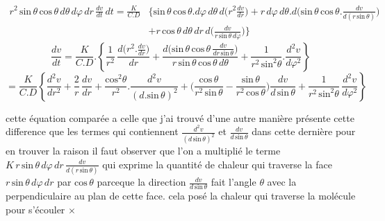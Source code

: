 \documentclass[11pt,a4paper]{article}
\begin{document}
\begin{align*}
r^2\,\text{sin}\,\theta\,\text{cos}\,\theta\,d\theta\,d\varphi\,dr\,\frac{dv}{dt}\,dt = \frac{K}{C.D} & \Big\{\text{sin}\,\theta\,\text{cos}\,\theta.d\varphi\,d\theta\,d\Big(r^2\frac{dv}{dr}\Big) + r\,d\varphi\,d\theta.d\Big(\text{sin}\,\theta\,\text{cos}\,\theta.\frac{dv}{d(r\,\text{sin}\,\theta)}\Big) \\
& + r\,\text{cos}\,\theta\,d\theta\,dr\,d\Big(\frac{dv}{r\,\text{sin}\,\theta\,d\varphi}\Big)\Big\}
\end{align*}
\[ \frac{dv}{dt} = \frac{K}{C.D}.\left\{\frac{1}{r^2}\,\frac{d\big(r^2.\frac{dv}{dr}\big)}{dr} + \frac{d\big(\text{sin}\,\theta\,\text{cos}\,\theta\,\frac{dv}{dr\,\text{sin}\,\theta}\big)}{r\,\text{sin}\,\theta\,\text{cos}\,\theta\,d\theta} + \frac{1}{r^2\,\text{sin}^2\theta}.\frac{d^2v}{d\varphi^2}\right\} \]
\[ = \frac{K}{C.D}\left\{\frac{d^2v}{dr^2} + \frac{2}{r}\,\frac{dv}{dr} + \frac{\text{cos}^2\theta}{r^2}.\frac{d^2v}{(d.\text{sin}\,\theta)^2} + \Big(\frac{\text{cos}\,\theta}{r^2\,\text{sin}\,\theta} - \frac{\text{sin}\,\theta}{r^2\,\text{cos}\,\theta}\Big)\frac{dv}{d\,\text{sin}\,\theta} + \frac{1}{r^2\,\text{sin}^2\theta}\,\frac{d^2v}{d\varphi^2}\right\} \]

cette équation comparée a celle que j'ai trouvé d'une
autre manière présente cette difference que les termes
qui contiennent $\frac{d^2v}{(d\,\text{sin}\,\theta)^2}$ et $\frac{dv}{d\,\text{sin}\,\theta}$   dans cette dernière
 pour en trouver la raison il faut observer que l'on a multiplié
le terme $K\,r\,\text{sin}\,\theta\,d\varphi\,dr\,\frac{dv}{d(r\,\text{sin}\,\theta)}$ qui exprime la quantité de chaleur
qui traverse la face $r\,\text{sin}\,\theta\,d\varphi\,dr$ par $\text{cos}\,\theta$ parceque la direction $\frac{dv}{d\,\text{sin}\,\theta}$
fait l'angle $\theta$ avec la perpendiculaire au plan de cette face.
cela posé la chaleur qui traverse la molécule pour s'écouler $\times$
\end{document}
